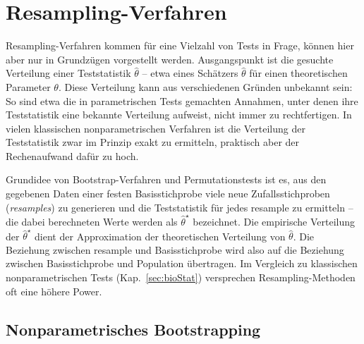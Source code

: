 \chapter{Resampling-Verfahren}
\label{sec:resampling}

Resampling-Verfahren kommen für eine Vielzahl von Tests in Frage, können hier aber nur in Grundzügen vorgestellt werden. Ausgangspunkt ist die gesuchte Verteilung einer Teststatistik $\hat{\theta}$ -- etwa eines Schätzers $\hat{\theta}$ für einen theoretischen Parameter $\theta$. Diese Verteilung kann aus verschiedenen Gründen unbekannt sein: So sind etwa die in parametrischen Tests gemachten Annahmen, unter denen ihre Teststatistik eine bekannte Verteilung aufweist, nicht immer zu rechtfertigen. In vielen klassischen nonparametrischen Verfahren ist die Verteilung der Teststatistik zwar im Prinzip exakt zu ermitteln, praktisch aber der Rechenaufwand dafür zu hoch.

Grundidee von Bootstrap-Verfahren und Permutationstests ist es, aus den gegebenen Daten einer festen Basisstichprobe viele neue Zufallsstichproben (\emph{resamples}) zu generieren und die Teststatistik für jedes resample zu ermitteln -- die dabei berechneten Werte werden als $\hat{\theta}^{\star}$ bezeichnet. Die empirische Verteilung der $\hat{\theta}^{\star}$ dient der Approximation der theoretischen Verteilung von $\hat{\theta}$. Die Beziehung zwischen resample und Basisstichprobe wird also auf die Beziehung zwischen Basisstichprobe und Population übertragen. Im Vergleich zu klassischen nonparametrischen Tests (Kap.\ \ref{sec:bioStat}) versprechen Resampling-Methoden oft eine höhere Power.

\section{Nonparametrisches Bootstrapping}
\label{sec:boot}

